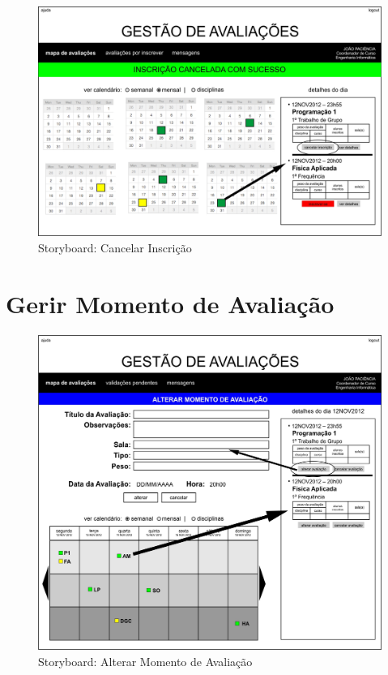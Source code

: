 \begin{figure}[!htbp]
\centering
\includegraphics{imagens/cancelar_inscricao_i.jpg}
\caption{Storyboard: Cancelar Inscrição}
\label{fig:cancelar_inscricao_i}
\end{figure}



\clearpage
\section{Gerir Momento de Avaliação}

\begin{figure}[!htbp]
\centering
\includegraphics{imagens/alterar_momento_de_avaliacao_i.jpg}
\caption{Storyboard: Alterar Momento de Avaliação}
\label{fig:alterar_momento_de_avaliacao_i}
\end{figure}

